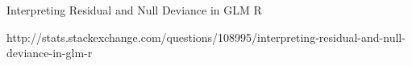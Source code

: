 Interpreting Residual and Null Deviance in GLM R

http://stats.stackexchange.com/questions/108995/interpreting-residual-and-null-deviance-in-glm-r
